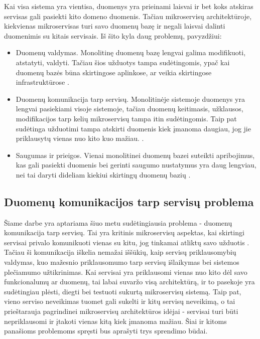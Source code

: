 \documentclass[fleqn]{VUMIFPSkursinis}
\begin{document}
Kai visa sistema yra vientisa, duomenys yra prieinami laisvai ir bet koks atskiras servisas gali pasiekti kito domeno duomenis. Tačiau mikroservisų architektūroje, kiekvienas mikroservisas turi savo duomenų bazę ir negali laisvai dalinti duomenimis su kitais servisais. Iš šito kyla daug problemų, pavyzdžiui:
\begin{itemize}
    \item Duomenų valdymas. Monolitinę duomenų bazę lengvai galima modifikuoti, atstatyti, valdyti. Tačiau šios užduotys tampa sudėtingomis, ypač kai duomenų bazės būna skirtingose aplinkose, ar veikia skirtingose infrastruktūrose \cite{LL19}.

    \item Duomenų komunikacija tarp servisų. Monolitinėje sistemoje duomenys yra lengvai pasiekiami visoje sistemoje, tačiau duomenų keitimasis, užklausos, modifikacijos tarp kelių mikroservisų tampa itin sudėtingomis. Taip pat sudėtinga užduotimi tampa atskirti duomenis kiek įmanoma daugiau, jog jie priklausytų vienas nuo kito kuo mažiau. \cite{AAP18}.

    \item Saugumas ir prieigos. Vienai monolitinei duomenų bazei suteikti apribojimus, kas gali pasiekti duomenis bei gerinti saugumo nustatymus yra daug lengviau, nei tai daryti dideliam kiekiui skirtingų duomenų bazių \cite{LL19}.\\
\end{itemize}


\subsection{Duomenų komunikacijos tarp servisų problema}
Šiame darbe yra aptariama šiuo metu sudėtingiausia problema - duomenų komunikacija tarp servisų. Tai yra kritinis mikroservisų aspektas, kai skirtingi servisai privalo komunikuoti vienas su kitu, jog tinkamai atliktų savo užduotis \cite{AAP18}. Tačiau ši komunikacija iškelia nemažai iššūkių, kaip servisų priklausomybių valdymas, kuo mažesnio priklausomumo tarp servisų išlaikymas bei sistemos plečiamumo užtikrinimas. Kai servisai yra priklausomi vienas nuo kito dėl savo funkcionalumų ar duomenų, tai labai suvaržo visą architektūrą, ir to pasekoje yra sudėtingiau plėsti, diegti bei testuoti sukurtą mikroservisų sistemą. Taip pat, vieno serviso neveikimas tuomet gali sukelti ir kitų servisų neveikimą, o tai prieštarauja pagrindinei mikroservisų architektūros idėjai - servisai turi būti nepriklausomi ir įtakoti vienas kitą kiek įmanoma mažiau. Šiai ir kitoms panašioms problemoms \cite{LZS+21} spręsti bus aprašyti trys sprendimo būdai.
\end{document}
